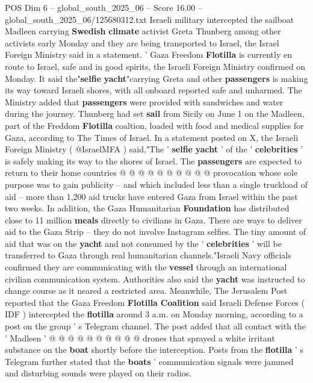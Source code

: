 \begin{textsample}{POS Dim 6 – global\_south\_2025\_06 – Score 16.00 – global\_south\_2025\_06/125680312.txt}  \label{ex:f6_pos_007}
Israeli military intercepted the sailboat Madleen carrying \textbf{Swedish} \textbf{climate} activist Greta Thunberg among other activists early Monday and they are being transported to Israel, the Israel Foreign Ministry said in a statement. ' Gaza Freedom \textbf{Flotilla} is currently en route to Israel, safe and in good spirits, the Israeli Foreign Ministry confirmed on Monday.
It said the"\textbf{selfie} \textbf{yacht}"carrying Greta and other \textbf{passengers} is making its way toward Israeli shores, with all onboard reported safe and unharmed.
The Ministry added that \textbf{passengers} were provided with sandwiches and water during the journey.
Thunberg had set \textbf{sail} from Sicily on June 1 on the Madleen, part of the Freddom \textbf{Flotilla} coaltion, loaded with food and medical supplies for Gaza, according to The Times of Israel.
In a statement posted on X, the Israeli Foreign Ministry ( @IsraelMFA ) said,"The ' \textbf{selfie} \textbf{yacht} ' of the ' \textbf{celebrities} ' is safely making its way to the shores of Israel.
The \textbf{passengers} are expected to return to their home countries @ @ @ @ @ @ @ @ @ @ provocation whose sole purpose was to gain publicity -- and which included less than a single truckload of aid -- more than 1,200 aid trucks have entered Gaza from Israel within the past two weeks.
In addition, the Gaza Humanitarian \textbf{Foundation} has distributed close to 11 million \textbf{meals} directly to civilians in Gaza.
There are ways to deliver aid to the Gaza Strip -- they do not involve Instagram selfies.
The tiny amount of aid that was on the \textbf{yacht} and not consumed by the ' \textbf{celebrities} ' will be transferred to Gaza through real humanitarian channels."Israeli Navy officials confirmed they are communicating with the \textbf{vessel} through an international civilian communication system.
Authorities also said the \textbf{yacht} was instructed to change course as it neared a restricted area.
Meanwhile, The Jerusalem Post reported that the Gaza Freedom \textbf{Flotilla} \textbf{Coalition} said Israeli Defense Forces ( IDF ) intercepted the \textbf{flotilla} around 3 a.m. on Monday morning, according to a post on the group ' s Telegram channel.
The post added that all contact with the ' Madleen ' @ @ @ @ @ @ @ @ @ @ drones that sprayed a white irritant substance on the \textbf{boat} shortly before the interception.
Posts from the \textbf{flotilla} ' s Telegram further stated that the \textbf{boats} ' communication signals were jammed and disturbing sounds were played on their radios.

\end{textsample}
